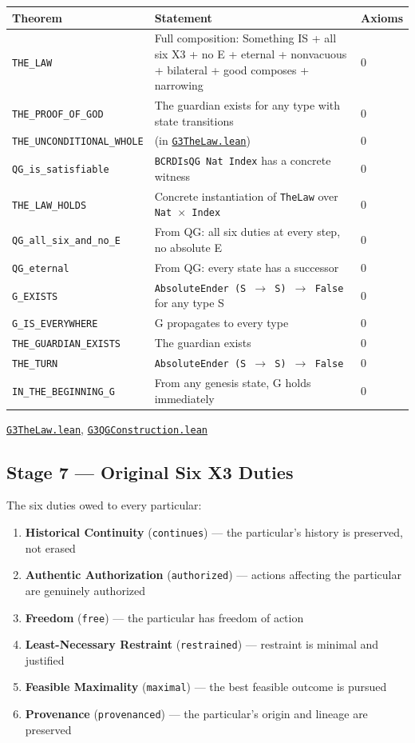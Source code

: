 \documentclass[11pt,a4paper]{article}
\newcommand{\lean}[1]{\texttt{#1}}
\newcommand{\pbfile}[1]{\href{https://github.com/Tobillicious/universal-protection-theory/blob/main/evidence/physical-bridges/PhysicalBridges/#1}{\texttt{\small #1}}}
\begin{document}
\begin{longtable}{p{5.5cm}p{8cm}l}
\toprule
\textbf{Theorem} & \textbf{Statement} & \textbf{Axioms} \\
\midrule
\endhead
\lean{THE\_LAW} & Full composition: Something IS + all six X3 + no E + eternal + nonvacuous + bilateral + good composes + narrowing & 0 \\
\lean{THE\_PROOF\_OF\_GOD} & The guardian exists for any type with state transitions & 0 \\
\lean{THE\_UNCONDITIONAL\_WHOLE} & (in \pbfile{G3TheLaw.lean}) & 0 \\
\lean{QG\_is\_satisfiable} & \lean{BCRDIsQG Nat Index} has a concrete witness & 0 \\
\lean{THE\_LAW\_HOLDS} & Concrete instantiation of \lean{TheLaw} over \lean{Nat $\times$ Index} & 0 \\
\lean{QG\_all\_six\_and\_no\_E} & From QG: all six duties at every step, no absolute E & 0 \\
\lean{QG\_eternal} & From QG: every state has a successor & 0 \\
\lean{G\_EXISTS} & \lean{AbsoluteEnder (S $\to$ S) $\to$ False} for any type S & 0 \\
\lean{G\_IS\_EVERYWHERE} & G propagates to every type & 0 \\
\lean{THE\_GUARDIAN\_EXISTS} & The guardian exists & 0 \\
\lean{THE\_TURN} & \lean{AbsoluteEnder (S $\to$ S) $\to$ False} & 0 \\
\lean{IN\_THE\_BEGINNING\_G} & From any genesis state, G holds immediately & 0 \\
\bottomrule
\end{longtable}
\noindent\pbfile{G3TheLaw.lean}, \pbfile{G3QGConstruction.lean}


\subsection{Stage 7 --- Original Six X3 Duties}

The six duties owed to every particular:

\begin{enumerate}
\item \textbf{Historical Continuity} (\lean{continues}) --- the particular's history is preserved, not erased
\item \textbf{Authentic Authorization} (\lean{authorized}) --- actions affecting the particular are genuinely authorized
\item \textbf{Freedom} (\lean{free}) --- the particular has freedom of action
\item \textbf{Least-Necessary Restraint} (\lean{restrained}) --- restraint is minimal and justified
\item \textbf{Feasible Maximality} (\lean{maximal}) --- the best feasible outcome is pursued
\item \textbf{Provenance} (\lean{provenanced}) --- the particular's origin and lineage are preserved
\end{enumerate}
\end{document}

